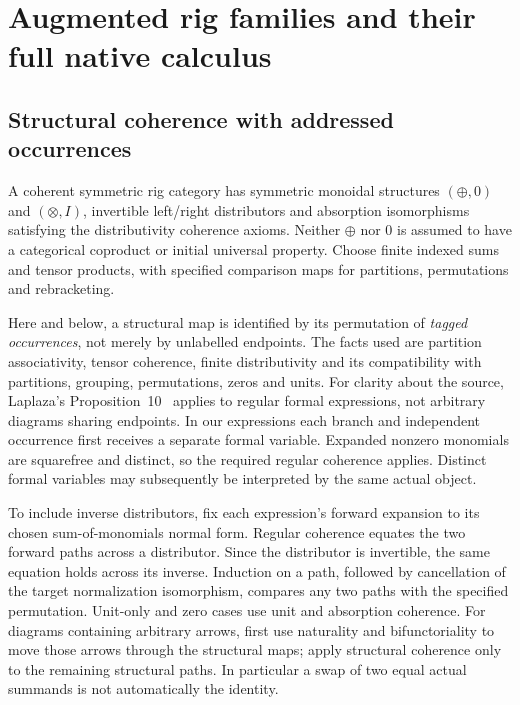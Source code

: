 \documentclass[11pt,a4paper]{article}
\theoremstyle{definition}
\begin{document}
\section{Augmented rig families and their full native calculus}\label{sec:rig}

\subsection{Structural coherence with addressed occurrences}
A coherent symmetric rig category has symmetric monoidal structures
$(\oplus,0)$ and $(\otimes,I)$, invertible left/right distributors and
absorption isomorphisms satisfying the distributivity coherence axioms.
Neither $\oplus$ nor $0$ is assumed to have a categorical coproduct or initial
universal property. Choose finite indexed sums and tensor products, with
specified comparison maps for partitions, permutations and rebracketing.

Here and below, a structural map is identified by its permutation of
\emph{tagged occurrences}, not merely by unlabelled endpoints. The facts used
are partition associativity, tensor coherence, finite distributivity and its
compatibility with partitions, grouping, permutations, zeros and units.
For clarity about the source, Laplaza's Proposition~10~\cite{Laplaza} applies
to regular formal expressions, not arbitrary diagrams sharing endpoints.
In our expressions each branch and independent occurrence first receives a
separate formal variable. Expanded nonzero monomials are squarefree and
distinct, so the required regular coherence applies. Distinct formal variables
may subsequently be interpreted by the same actual object.

To include inverse distributors, fix each expression's forward expansion to
its chosen sum-of-monomials normal form. Regular coherence equates the two
forward paths across a distributor. Since the distributor is invertible, the
same equation holds across its inverse. Induction on a path, followed by
cancellation of the target normalization isomorphism, compares any two paths
with the specified permutation. Unit-only and zero cases use unit and
absorption coherence. For diagrams containing arbitrary arrows, first use
naturality and bifunctoriality to move those arrows through the structural
maps; apply structural coherence only to the remaining structural paths.
In particular a swap of two equal actual summands is not automatically the
identity.
\end{document}
